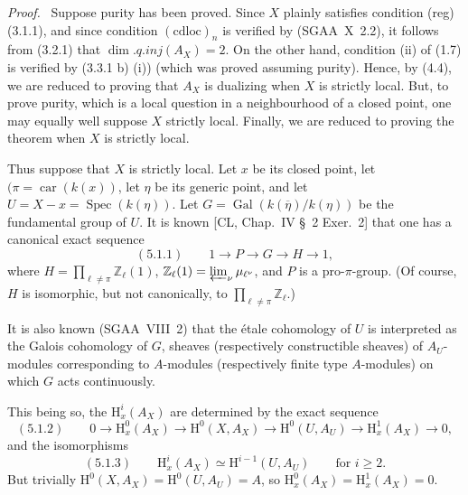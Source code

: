 \documentclass[11pt]{article}
\newenvironment{prooftext}[1][Proof]{\par\noindent\emph{#1.}\ }{\par\medskip}
\renewcommand{\H}{\mathrm{H}}
\DeclareMathOperator{\Spec}{Spec}
\newcommand{\Z}{\mathbb{Z}}
\newcommand{\ol}[1]{\overline{#1}}
\providecommand{\Gal}{\operatorname{Gal}}
\providecommand{\car}{\operatorname{car}}
\providecommand{\car}{\operatorname{car}}
\providecommand{\Z}{\mathbb Z}
\providecommand{\Spec}{\operatorname{Spec}}
\providecommand{\Spec}{\operatorname{Spec}}
\providecommand{\Spec}{\operatorname{Spec}}
\providecommand{\car}{\operatorname{car}}
\providecommand{\Spec}{\operatorname{Spec}}
\providecommand{\Gal}{\operatorname{Gal}}
\begin{document}
\begin{prooftext}[Proof]
Suppose purity has been proved. Since $X$ plainly satisfies condition (reg) (3.1.1), and since condition $(\mathrm{cdloc})_n$ is verified by (SGAA~X~2.2), it follows from (3.2.1) that $\dim.q.inj(A_X)=2$. On the other hand, condition (ii) of (1.7) is verified by (3.3.1 b) (i)) (which was proved assuming purity). Hence, by (4.4), we are reduced to proving that $A_X$ is dualizing when $X$ is strictly local. But, to prove purity, which is a local question in a neighbourhood of a closed point, one may equally well suppose $X$ strictly local. Finally, we are reduced to proving the theorem when $X$ is strictly local.

Thus suppose that $X$ is strictly local. Let $x$ be its closed point, let $(\pi=\car(k(x))$, let $\eta$ be its generic point, and let $U=X-x=\Spec(k(\eta))$. Let $G=\Gal(k(\ol{\eta})/k(\eta))$ be the fundamental group of $U$. It is known [CL, Chap.~IV \S~2 Exer.~2] that one has a canonical exact sequence
\[
(5.1.1)\qquad 1\longrightarrow P\longrightarrow G\longrightarrow H\longrightarrow1,
\]
where $H=\prod_{\ell\ne\pi}\Z_\ell(1)$, $\Z_\ell(1)=\varprojlim_{\nu} \mu_{\ell^\nu}$, and $P$ is a pro-$\pi$-group. (Of course, $H$ is isomorphic, but not canonically, to $\prod_{\ell\ne\pi}\Z_\ell$.)

It is also known (SGAA~VIII~2) that the étale cohomology of $U$ is interpreted as the Galois cohomology of $G$, sheaves (respectively constructible sheaves) of $A_U$-modules corresponding to $A$-modules (respectively finite type $A$-modules) on which $G$ acts continuously.

This being so, the $\H_x^i(A_X)$ are determined by the exact sequence
\[
(5.1.2)\qquad 0\longrightarrow \H_x^0(A_X)\longrightarrow \H^0(X,A_X)\longrightarrow \H^0(U,A_U)\longrightarrow \H_x^1(A_X)\longrightarrow0,
\]
and the isomorphisms
\[
(5.1.3)\qquad \H_x^i(A_X)\simeq \H^{i-1}(U,A_U)\qquad\text{for }i\geqslant2.
\]
But trivially $\H^0(X,A_X)=\H^0(U,A_U)=A$, so $\H_x^0(A_X)=\H_x^1(A_X)=0$.


\end{prooftext}
\end{document}
